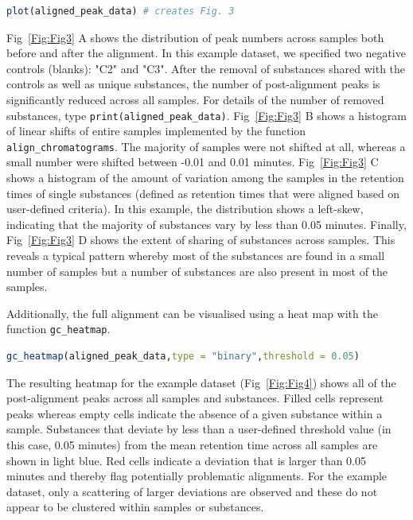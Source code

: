 \documentclass[10pt,letterpaper]{article}
\begin{document}
\begin{lstlisting}[language=R]
plot(aligned_peak_data) # creates Fig. 3
\end{lstlisting}

Fig~\ref{Fig:Fig3} A shows the distribution of peak numbers across samples both before and after the alignment.  In this example dataset, we specified two negative controls (blanks): "C2" and "C3".  After the removal of substances shared with the controls as well as unique substances, the number of post-alignment peaks is significantly reduced across all samples.  For details of the number of removed substances, type \texttt{print(aligned\_peak\_data)}. Fig~\ref{Fig:Fig3} B shows a histogram of linear shifts of entire samples implemented by the function \texttt{align\_chromatograms}. The majority of samples were not shifted at all, whereas a small number were shifted between -0.01 and 0.01 minutes. Fig~\ref{Fig:Fig3} C shows a histogram of the amount of variation among the samples in the retention times of single substances (defined as retention times that were aligned based on user-defined criteria). In this example, the distribution shows a left-skew, indicating that the majority of substances vary by less than 0.05 minutes. Finally, Fig~\ref{Fig:Fig3} D shows the extent of sharing of substances across samples. This reveals a typical pattern whereby most of the substances are found in a small number of samples but a number of substances are also present in most of the samples. \par	

Additionally, the full alignment can be visualised using a heat map with the function \texttt{gc\_heatmap}.

\begin{lstlisting}[language=R]
gc_heatmap(aligned_peak_data,type = "binary",threshold = 0.05)
\end{lstlisting}

The resulting heatmap for the example dataset (Fig~\ref{Fig:Fig4}) shows all of the post-alignment peaks across all samples and substances.  Filled cells represent peaks whereas empty cells indicate the absence of a given substance within a sample. Substances that deviate by less than a user-defined threshold value (in this case, 0.05 minutes) from the mean retention time across all samples are shown in light blue. Red cells indicate a deviation that is larger than 0.05 minutes and thereby flag potentially problematic alignments. For the example dataset, only a scattering of larger deviations are observed and these do not appear to be clustered within samples or substances.
\end{document}
